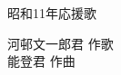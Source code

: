 \documentclass[10pt,b5j]{tarticle} %
\begin{document}
\begin{minipage}[c]{0.7\hsize} %
    \begin{center}
        {\LARGE
            昭和11年応援歌 %
        }
        {\small 
        }
    \end{center}
\end{minipage}
\begin{minipage}[c]{0.3\hsize} %
    \begin{flushright} %
        河邨文一郎君 作歌\\能登君 作曲 %
    \end{flushright}
\end{minipage}
\end{document}
